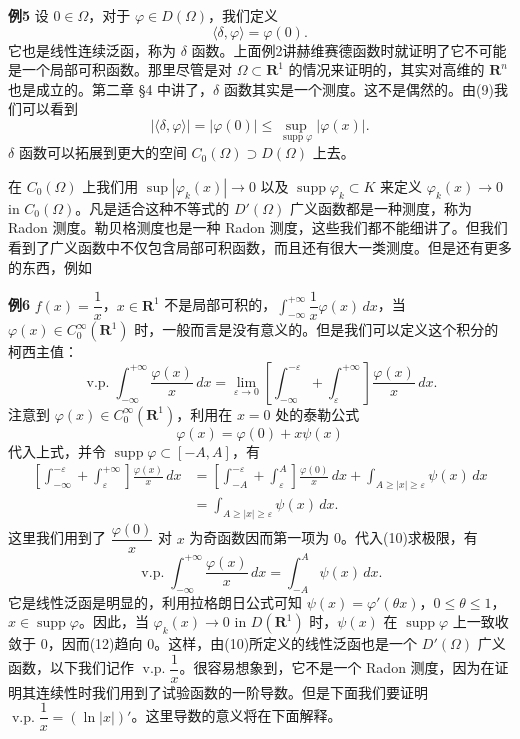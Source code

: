 \noindent\textbf{例5}
设 $0\in\Omega$，对于 $\varphi\in D(\Omega)$，我们定义
\begin{equation}
 \langle\delta,\varphi\rangle=\varphi(0).
 \tag{9}
\end{equation}
它也是线性连续泛函，称为 $\delta$ 函数。上面例2讲赫维赛德函数时就证明了它不可能是一个局部可积函数。那里尽管是对 $\Omega\subset\mathbf R^1$ 的情况来证明的，其实对高维的 $\mathbf R^n$ 也是成立的。第二章 §4 中讲了，$\delta$ 函数其实是一个测度。这不是偶然的。由(9)我们可以看到
\[
 |\langle\delta,\varphi\rangle|=|\varphi(0)|\le \sup_{\operatorname{supp}\varphi}|\varphi(x)|.
\]
$\delta$ 函数可以拓展到更大的空间 $C_0(\Omega)\supset D(\Omega)$ 上去。\par
在 $C_0(\Omega)$ 上我们用 $\sup|\varphi_k(x)|\to0$ 以及 $\operatorname{supp}\varphi_k\subset K$ 来定义 $\varphi_k(x)\to0$ in $C_0(\Omega)$。\linebreak[1] 凡是适合这种不等式的 $D'(\Omega)$ 广义函数都是一种测度，称为 Radon 测度。勒贝格测度也是一种 Radon 测度，这些我们都不能细讲了。但我们看到了广义函数中不仅包含局部可积函数，而且还有很大一类测度。但是还有更多的东西，例如

\noindent\textbf{例6}
$f(x)=\dfrac1x$，$x\in\mathbf R^1$ 不是局部可积的，$\displaystyle\int_{-\infty}^{+\infty}\dfrac1x\varphi(x)\,dx$，当 $\varphi(x)\in C_0^\infty(\mathbf R^1)$ 时，一般而言是没有意义的。但是我们可以定义这个积分的柯西主值：
\begin{equation}
 \operatorname{v.p.}\!\int_{-\infty}^{+\infty}\frac{\varphi(x)}x\,dx
 =\lim_{\varepsilon\to0}\left[
 \int_{-\infty}^{-\varepsilon}+\int_{\varepsilon}^{+\infty}
 \right]\frac{\varphi(x)}x\,dx.
 \tag{10}
\end{equation}
注意到 $\varphi(x)\in C_0^\infty(\mathbf R^1)$，利用在 $x=0$ 处的泰勒公式
\begin{equation}
 \varphi(x)=\varphi(0)+x\psi(x)
 \tag{11}
\end{equation}
代入上式，并令 $\operatorname{supp}\varphi\subset[-A,A]$，有
\[
\begin{aligned}
 \left[\int_{-\infty}^{-\varepsilon}+\int_{\varepsilon}^{+\infty}\right]\frac{\varphi(x)}x\,dx
 &=\left[\int_{-A}^{-\varepsilon}+\int_{\varepsilon}^{A}\right]\frac{\varphi(0)}x\,dx
 +\int_{A\ge|x|\ge\varepsilon}\psi(x)\,dx\\
 &=\int_{A\ge|x|\ge\varepsilon}\psi(x)\,dx.
\end{aligned}
\]
这里我们用到了 $\dfrac{\varphi(0)}x$ 对 $x$ 为奇函数因而第一项为 0。代入(10)求极限，有
\begin{equation}
 \operatorname{v.p.}\!\int_{-\infty}^{+\infty}\frac{\varphi(x)}x\,dx
 =\int_{-A}^{A}\psi(x)\,dx.
 \tag{12}
\end{equation}
它是线性泛函是明显的，利用拉格朗日公式可知 $\psi(x)=\varphi'(\theta x)$，$0\le\theta\le1$，$x\in\operatorname{supp}\varphi$。因此，当 $\varphi_k(x)\to0$ in $D(\mathbf R^1)$ 时，$\psi(x)$ 在 $\operatorname{supp}\varphi$ 上一致收敛于 0，因而(12)趋向 0。这样，由(10)所定义的线性泛函也是一个 $D'(\Omega)$ 广义函数，以下我们记作 $\operatorname{v.p.}\dfrac1x$。很容易想象到，它不是一个 Radon 测度，因为在证明其连续性时我们用到了试验函数的一阶导数。但是下面我们要证明 $\operatorname{v.p.}\dfrac1x=(\ln|x|)'$。这里导数的意义将在下面解释。

